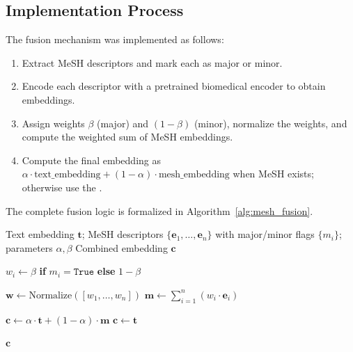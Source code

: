 \documentclass{ieeeaccess}
\begin{document}
\subsection{Implementation Process}

The fusion mechanism was implemented as follows:
\begin{enumerate}[leftmargin=*,label=\arabic*.]
    \item Extract MeSH descriptors and mark each as major or minor.
    \item Encode each descriptor with a pretrained biomedical encoder to obtain embeddings.
    \item Assign weights $\beta$ (major) and $(1-\beta)$ (minor), normalize the weights, and compute the weighted sum of MeSH embeddings.
    \item Compute the final embedding as $\alpha\cdot\text{text\_embedding} + (1-\alpha)\cdot\text{mesh\_embedding}$ when MeSH exists; otherwise use the .
\end{enumerate}

The complete fusion logic is formalized in Algorithm~\ref{alg:mesh_fusion}.

\begin{algorithm}[H]
\caption{Text--MeSH Fusion with Major/Minor Weights}
\label{alg:mesh_fusion} 
\begin{algorithmic}[1]
\Require Text embedding $\bm{t}$; MeSH descriptors $\{\bm{e}_1,\ldots,\bm{e}_n\}$ with major/minor flags $\{m_i\}$; parameters $\alpha,\beta$
\Ensure Combined embedding $\bm{c}$

    \State $w_i \gets \beta$ \textbf{if} $m_i = \texttt{True}$ \textbf{else} $1-\beta$
\EndFor

\State $\bm{w} \gets \mathrm{Normalize}([w_1,\ldots,w_n])$
\State $\bm{m} \gets \sum_{i=1}^{n} (w_i \cdot \bm{e}_i)$

    \State $\bm{c} \gets \alpha \cdot \bm{t} + (1-\alpha) \cdot \bm{m}$
\Else
    \State $\bm{c} \gets \bm{t}$
\EndIf

\State \Return $\bm{c}$
\end{algorithmic}
\end{algorithm}
\end{document}
